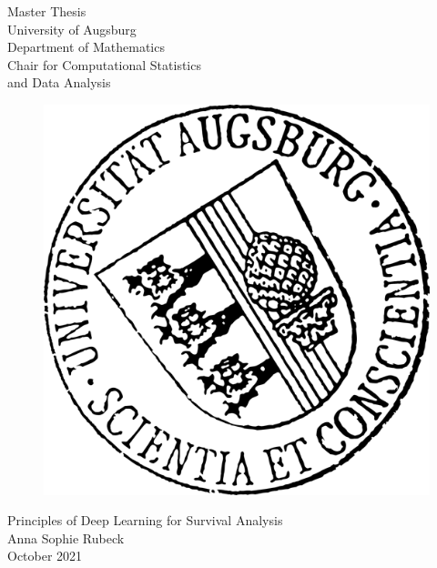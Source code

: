 \documentclass[12pt, a4paper]{scrartcl}
\theoremstyle{definition}
\theoremstyle{plain}
\numberwithin{equation}{section}
\numberwithin{figure}{section}
\numberwithin{table}{section}
\begin{document}
	\begin{center}
		\Huge Master Thesis\\
		\vspace{0.5cm}
		\LARGE University of Augsburg\\
		\vspace{0.3cm}
		Department of Mathematics\\
		\vspace{0.3cm}
		Chair for Computational Statistics\\ and Data Analysis
		\vspace{0.7cm}
		
		
	\end{center}
	\vspace{0.5cm}
	
	\begin{figure}[h]
		\begin{center}
			\includegraphics[scale=1.35]
			{Uni_Aug_Siegel_32Grad_schwarz.png}
		\end{center}
	\end{figure}
	
	\begin{center}
		\vspace{0.4cm}
		{\LARGE{{Principles of Deep Learning for Survival Analysis}}}\\
		\vspace{2cm}
		\LARGE {Anna Sophie Rubeck}\\
		\vspace{0.9cm}
		\large{October 2021}
	\end{center}
	\newpage
\end{document}
